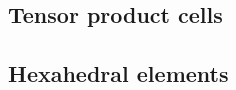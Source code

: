 \documentclass[thesis]{subfiles}
\begin{document}
\subsection{Tensor product cells}

\subsection{Hexahedral elements}


\end{document}
